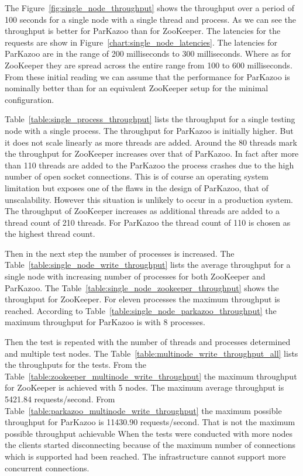 



The Figure~\ref{fig:single_node_throughput} shows the throughput over a period of 100 seconds for a single node with a single thread and process. As we can see the throughput is better for ParKazoo than for ZooKeeper. The latencies for the requests are show in Figure~\ref{chart:single_node_latencies}. The latencies for ParKazoo are in the range of 200 milliseconds to 300 milliseconds. Where as for ZooKeeper they are spread across the entire range from 100 to 600 milliseconds. From these initial reading we can assume that the performance for ParKazoo is nominally better than for an equivalent ZooKeeper setup for the minimal configuration.



Table~\ref{table:single_process_throughput} lists the throughput for a single testing node with a single process. The throughput for ParKazoo is initially higher. But it does not scale linearly as more threads are added. Around the 80 threads mark the throughput for ZooKeeper increases over that of ParKazoo. In fact after more than 110 threads are added to the ParKazoo the process crashes due to the high number of open socket connections. This is of course an operating system limitation but exposes one of the flaws in the design of ParKazoo, that of unscalability. However this situation is unlikely to occur in a production system. The throughput of ZooKeeper increases as additional threads are added to a thread count of 210 threads. For ParKazoo the thread count of 110 is chosen as the highest thread count.



Then in the next step the number of processes is increased. The Table~\ref{table:single_node_write_throughput} lists the average throughput for a single node with increasing number of processes for both ZooKeeper and ParKazoo. The Table~\ref{table:single_node_zookeeper_throughput} shows the throughput for ZooKeeper. For eleven processes the maximum throughput is reached. According to Table~\ref{table:single_node_parkazoo_throughput} the maximum throughput for ParKazoo is with 8 processes.

Then the test is repeated with the number of threads and processes determined and multiple test nodes. The Table~\ref{table:multinode_write_throughput_all} lists the throughputs for the tests. From the Table~\ref{table:zookeeper_multinode_write_throughput} the maximum throughput for ZooKeeper is achieved with 5 nodes. The maximum average throughput is 5421.84 requests/second. From Table~\ref{table:parkazoo_multinode_write_throughput} the maximum possible throughput for ParKazoo is 11430.90 requests/second. That is not the maximum possible throughput achievable When the tests were conducted with more nodes the clients started disconnecting because of the maximum number of connections which is supported had been reached. The infrastructure cannot support more concurrent connections.

